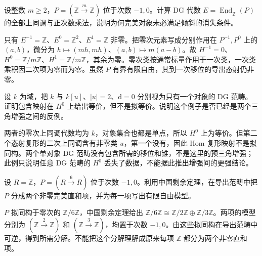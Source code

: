\begin{optionalexercise}\label{b4:ex:20-endomorphism-two-term}
	设整数 \(m\ge2\)，\(P=(\mathbb Z\xrightarrow{m}\mathbb Z)\) 位于次数 \(-1,0\)。计算 DG 代数 \(E=\underline{\operatorname{End}}_{\mathbb Z}(P)\) 的全部上同调与正次数乘法，说明为何完美对象未必满足倾斜的消失条件。
\end{optionalexercise}
\begin{solution}
	只有 \(E^{-1}=\mathbb Z\)、\(E^0=\mathbb Z^2\)、\(E^1=\mathbb Z\) 非零。把零次元素写成分别作用在 \(P^{-1},P^0\) 上的 \((a,b)\)，微分为 \(h\mapsto(mh,mh)\)、\((a,b)\mapsto m(a-b)\)。故 \(H^{-1}=0\)、\(H^0=\mathbb Z/m\mathbb Z\)、\(H^1=\mathbb Z/m\mathbb Z\)，其余为零。零次类按通常标量作用于一次类，一次类乘积因二次项为零而为零。虽然 \(P\) 有界有限自由，其到一次移位的导出态射仍非零。
\end{solution}

\begin{optionalexercise}\label{b4:ex:20-hzero-not-quasi-equivalence}
	设 \(k\) 为域，把 \(k\) 与 \(k[u]\)、\(|u|=2\)、\(\mathrm{d}=0\) 分别视为只有一个对象的 DG 范畴。证明包含映射在 \(H^0\) 上给出等价，但不是拟等价。说明这个例子是否已经是两个三角增强之间的反例。
\end{optionalexercise}
\begin{solution}
	两者的零次上同调代数均为 \(k\)，对象集合也都是单点，所以 \(H^0\) 上为等价。但第二个态射复形的二次上同调含有非零类 \(u\)，第一个没有，因此 Hom 复形映射不是拟同构。两个单对象 DG 范畴没有包含所需的移位和锥，不是这里的预三角增强；此例只说明任意 DG 范畴的 \(H^0\) 丢失了数据，不能据此推出增强间的更强结论。
\end{solution}

\begin{optionalexercise}\label{b4:ex:20-perfect-nonprojective-summand}
	设 \(R=\mathbb Z\)，\(P=(R\xrightarrow{6}R)\) 位于次数 \(-1,0\)。利用中国剩余定理，在导出范畴中把 \(P\) 分成两个非零完美直和项，并为每一项写出有限自由模型。
\end{optionalexercise}
\begin{solution}
	\(P\) 拟同构于零次的 \(\mathbb Z/6\mathbb Z\)，中国剩余定理给出 \(\mathbb Z/6\mathbb Z\cong\mathbb Z/2\mathbb Z\oplus\mathbb Z/3\mathbb Z\)。两项的模型分别为 \((\mathbb Z\xrightarrow{2}\mathbb Z)\) 和 \((\mathbb Z\xrightarrow{3}\mathbb Z)\)，均置于次数 \(-1,0\)。由这些拟同构在导出范畴中可逆，得到所需分解。不能把这个分解理解成原来每项 \(\mathbb Z\) 都分为两个非零直和项。
\end{solution}

